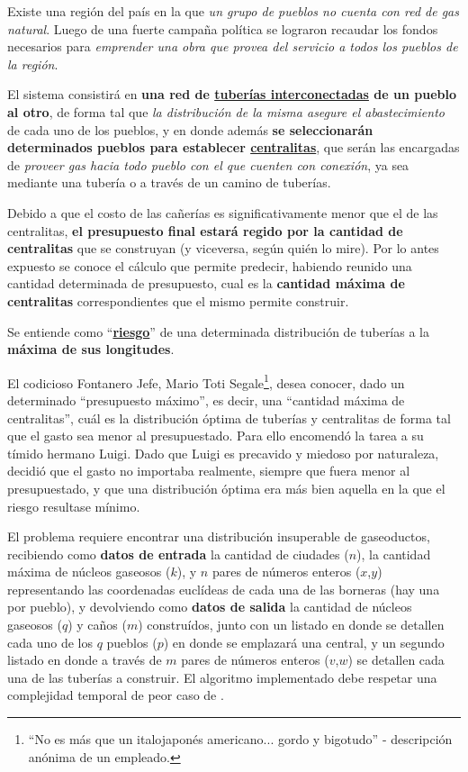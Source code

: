 \documentclass[11pt, a4paper, twoside]{article}
\begin{document}
{}

Existe una región del país en la que \emph{un grupo de pueblos no cuenta con red de gas natural}.
Luego de una fuerte campaña política se lograron recaudar los fondos necesarios para \emph{emprender
una obra que provea del servicio a todos los pueblos de la región}.

El sistema consistirá en \textbf{una red de \underline{tuberías interconectadas} de un pueblo al
otro}, de forma tal que \emph{la distribución de la misma asegure el abastecimiento} de cada uno de
los pueblos, y en donde además \textbf{se seleccionarán determinados pueblos para establecer
\underline{centralitas}}, que serán las encargadas de \emph{proveer gas hacia todo pueblo con el que
cuenten con conexión}, ya sea mediante una tubería o a través de un camino de tuberías.

Debido a que el costo de las cañerías es significativamente menor que el de las centralitas,
\textbf{el presupuesto final estará regido por la cantidad de centralitas} que se construyan (y
viceversa, según quién lo mire). Por lo antes expuesto se conoce el cálculo que permite predecir,
habiendo reunido una cantidad determinada de presupuesto, cual es la \textbf{cantidad máxima de
centralitas} correspondientes que el mismo permite construir.

Se entiende como ``\underline{\textbf{riesgo}}'' de una determinada distribución de tuberías a la
\textbf{máxima de sus longitudes}.

El codicioso Fontanero Jefe, Mario Toti Segale\footnote{``No es más que un italojaponés americano...
gordo y bigotudo'' - descripción anónima de un empleado.}, desea conocer, dado un determinado
``presupuesto máximo'', es decir, una ``cantidad máxima de centralitas'', cuál es la distribución
óptima de tuberías y centralitas de forma tal que el gasto sea menor al presupuestado. Para ello
encomendó la tarea a su tímido hermano Luigi. Dado que Luigi es precavido y miedoso por naturaleza,
decidió que el gasto no importaba realmente, siempre que fuera menor al presupuestado, y que una
distribución óptima era más bien aquella en la que el riesgo resultase mínimo.


El problema requiere encontrar una distribución insuperable de gaseoductos, recibiendo como
\textbf{datos de entrada} la cantidad de ciudades ($n$), la cantidad máxima de núcleos gaseosos
($k$), y $n$ pares de números enteros ($x$,$y$) representando las coordenadas euclídeas de cada una
de las borneras (hay una por pueblo), y devolviendo como \textbf{datos de salida} la cantidad de
núcleos gaseosos ($q$) y caños ($m$) construídos, junto con un listado en donde se detallen cada uno
de los $q$ pueblos ($p$) en donde se emplazará una central, y un segundo listado en donde a través
de $m$ pares de números enteros ($v$,$w$) se detallen cada una de las tuberías a construir. El
algoritmo implementado debe respetar una complejidad temporal de peor caso de .
\end{document}
